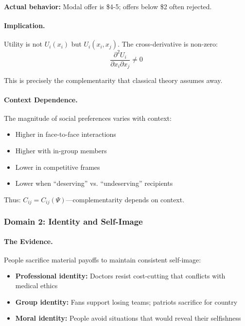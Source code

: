 \documentclass[12pt,a4paper]{article}
\begin{document}
\textbf{Actual behavior:} Modal offer is \$4-5; offers below \$2 often rejected.

\paragraph{Implication.}
Utility is not $U_i(x_i)$ but $U_i(x_i, x_j)$.
The cross-derivative is non-zero:
\begin{equation}
  \frac{\partial^2 U_i}{\partial x_i \partial x_j} \neq 0
\end{equation}

This is precisely the complementarity that classical theory assumes away.

\paragraph{Context Dependence.}
The magnitude of social preferences varies with context:
\begin{itemize}
  \item Higher in face-to-face interactions
  \item Higher with in-group members
  \item Lower in competitive frames
  \item Lower when ``deserving'' vs. ``undeserving'' recipients
\end{itemize}

Thus: $C_{ij} = C_{ij}(\Psi)$---complementarity depends on context.

\subsubsection{Domain 2: Identity and Self-Image}

\paragraph{The Evidence.}
People sacrifice material payoffs to maintain consistent self-image:
\begin{itemize}
  \item \textbf{Professional identity:} Doctors resist cost-cutting that conflicts with medical ethics
  \item \textbf{Group identity:} Fans support losing teams; patriots sacrifice for country
  \item \textbf{Moral identity:} People avoid situations that would reveal their selfishness
\end{itemize}
\end{document}

